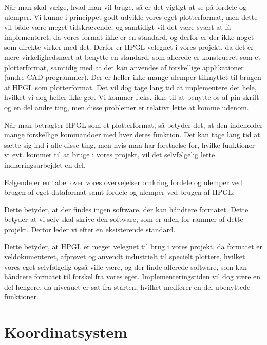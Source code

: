 Når man skal vælge, hvad man vil bruge, så er det vigtigt at se på
fordele og ulemper. Vi kunne i princippet godt udvikle vores eget
plotterformat, men dette vil både være meget tidskrævende, og
samtidigt vil det være svært at få implementeret, da vores format ikke
er en standard, og derfor er der ikke noget som direkte virker med
det. Derfor er HPGL velegnet i vores projekt, da det er mere
virkelighedsnært at benytte en standard, som allerede er konstrueret
som et plotterformat, samtidig med at det kan anvendes af forskellige
applikationer (andre CAD programmer). Der er heller ikke mange ulemper
tilknyttet til brugen af HPGL som plotterformat. Det vil dog tage lang
tid at implementere det hele, hvilket vi dog heller ikke gør. Vi
kommer f.eks. ikke til at benytte os af pin-skrift og en del andre
ting, men disse problemer er relativt lette at komme udenom.

Når man betragter HPGL som et plotterformat, så betyder det, at den
indeholder mange forskellige kommandoer med hver deres funktion. Det
kan tage lang tid at sætte sig ind i alle disse ting, men hvis man har
forståelse for, hvilke funktioner vi evt. kommer til at bruge i vores
projekt, vil det selvfølgelig lette indlæringsarbejdet en del.

Følgende er en tabel over vores overvejelser omkring fordele og
ulemper ved brugen af eget dataformat samt fordele og ulemper ved
brugen af HPGL:


Dette betyder, at der findes ingen software, der kan håndtere
formatet. Dette betyder at vi selv skal skrive den software, som er
uden for rammer af dette projekt. Derfor leder vi efter en
eksisterende standard.


Dette betyder, at HPGL er meget velegnet til brug i vores projekt, da
formatet er veldokumenteret, afprøvet og anvendt industrielt til
specielt plottere, hvilket vores eget selvfølgelig også ville være, og
der finde allerede software, som kan håndtere formatet til forskel fra
vores eget. Implementeringstiden vil dog være en del længere, da
niveauet er sat fra starten, hvilket medfører en del ubenyttede
funktioner.


\section{Koordinatsystem}

